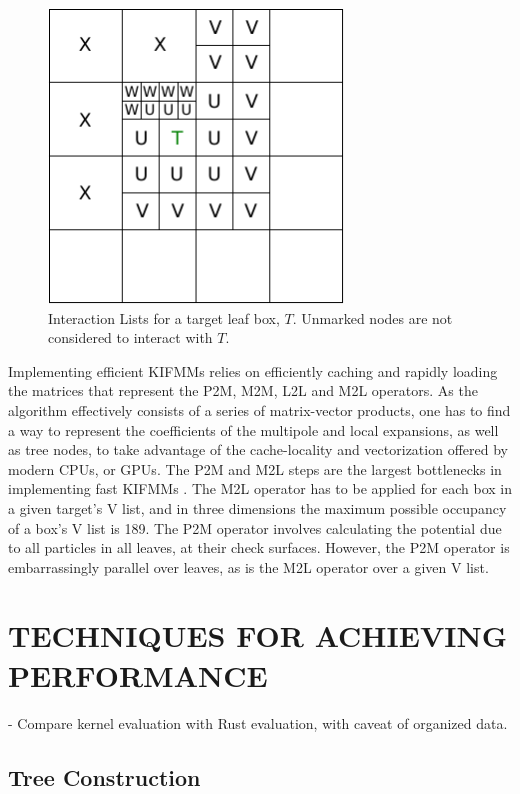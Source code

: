 \documentclass{IEEEcsmag}
\begin{document}
\begin{figure}
\centerline{\includegraphics[width=18.5pc]{figures/interaction_lists.pdf}}
\caption{Interaction Lists for a target leaf box, $T$. Unmarked nodes are not considered to interact with $T$.}
\label{fig:interaction_lists}
\end{figure}

Implementing efficient KIFMMs relies on efficiently caching and rapidly loading the matrices that represent the P2M, M2M, L2L and M2L operators. As the algorithm effectively consists of a series of matrix-vector products, one has to find a way to represent the coefficients of the multipole and local expansions, as well as tree nodes, to take advantage of the cache-locality and vectorization offered by modern CPUs, or GPUs. The P2M and M2L steps are the largest bottlenecks in implementing fast KIFMMs \cite{Lashuk2012}. The M2L operator has to be applied for each box in a given target's V list, and in three dimensions the maximum possible occupancy of a box's V list is 189. The P2M operator involves calculating the potential due to all particles in all leaves, at their check surfaces. However, the P2M operator is embarrassingly parallel over leaves, as is the M2L operator over a given V list.

\section{TECHNIQUES FOR ACHIEVING PERFORMANCE}

- Compare kernel evaluation with Rust evaluation, with caveat of organized data.

\subsection{Tree Construction}
\end{document}
